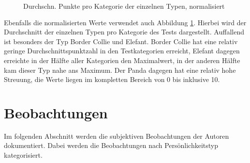 	\begin{figure}[htbp!]
		\centering
		\caption[Auswertung Durchschnitt]{Durchschn. Punkte pro Kategorie der einzelnen Typen, normalisiert}
		\label{img:auswertung_typus}
	\end{figure}

	Ebenfalls die normalisierten Werte verwendet auch Abbildung \ref{img:auswertung_typus}. Hierbei wird der Durchschnitt der einzelnen Typen pro Kategorie des Tests dargestellt. Auffallend ist besonders der Typ Border Collie und Elefant. Border Collie hat eine relativ geringe Durchschnittspunktzahl in den Testkategorien erreicht, Elefant dagegen erreichte in der Hälfte aller Kategorien den Maximalwert, in der anderen Hälfte kam dieser Typ nahe ans Maximum. Der Panda dagegen hat eine relativ hohe Streuung, die Werte liegen im kompletten Bereich von 0 bis inklusive 10.\\

\section{Beobachtungen}
	Im folgenden Abschnitt werden die subjektiven Beobachtungen der Autoren dokumentiert. Dabei werden die Beobachtungen nach Persönlichkeitstyp kategorisiert.
